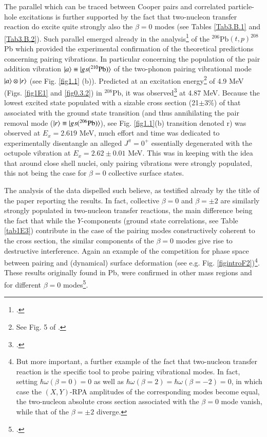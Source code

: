  The parallel which can be traced between Cooper pairs and correlated particle-hole excitations is further supported by the fact that two-nucleon transfer reaction do excite quite strongly also the $\beta=0$ modes (see Tables \ref{Tab3.B.1} and \ref{Tab3.B.2}). 
Such parallel  emerged already in the analysis\footnote{\cite{Broglia:67}.} of the $^{206}$Pb$(t,p)^{208}$Pb which provided the experimental confirmation of the theoretical predictions concerning pairing vibrations. In particular concerning the population of the pair addition vibration $|{a} \rangle\equiv|{gs(^{210}\text{Pb})} \rangle$ of the two-phonon pairing vibrational mode $|{a} \rangle\otimes|{r} \rangle$ (see Fig. \ref{fig1.1} (b)).  Predicted at an excitation energy\footnote{See Fig. 5 of \cite{Bes:66}.} of 4.9 MeV (Figs. \ref{fig1E1} and \ref{fig0.3.2}) in $^{208}$Pb, it was observed\footnote{\cite{Bjerregaard:66b}.} at 4.87 MeV. Because the lowest excited state populated with a sizable cross section (21$\pm3\%$) of that associated with the ground state transition (and thus annihilating the pair removal mode ($|{r} \rangle\equiv|{gs(^{206}\text{Pb})} \rangle$), see Fig. \ref{fig1.1}(b) transition denoted r) was observed at $E_x=2.619$ MeV, much effort and time was dedicated to experimentally disentangle an alleged $J^\pi=0^+$ essentially degenerated with the octupole vibration at $E_x=2.62\pm0.01$ MeV.  This was in keeping with the idea that around close shell nuclei, only pairing vibrations were strongly populated, this not being the case for $\beta=0$ collective surface states. 

The analysis of the data dispelled such believe, as testified already by the title of the paper reporting the results. In fact, collective $\beta=0$ and $\beta=\pm2$ are similarly strongly populated in two-nucleon transfer reactions, the main difference being the fact that while the $Y$-components (ground state correlations, see Table  \ref{tab1E3}) contribute in the case of the pairing modes constructively coherent to the cross section, the similar components of the $\beta=0$ modes give rise to destructive interference. Again an example of the competition for phase space between pairing and (dynamical) surface deformation (see e.g. Fig. \ref{figintroF2})\footnote{But more important, a further example of the fact that two-nucleon transfer reaction is the specific tool to probe pairing vibrational modes. In fact, setting $\hbar\omega(\beta=0)=0$ as well as $\hbar\omega(\beta=2)=\hbar\omega(\beta=-2)=0$, in which case the $(X,Y)$-RPA amplitudes of the corresponding modes become equal, the two-nucleon absolute cross section associated with the $\beta=0$ mode vanish, while that of the $\beta=\pm2$ diverge.}. These results originally found in Pb, were confirmed in other mass regions and for different $\beta=0$ modes\footnote{\cite{Broglia:71}.}. 


